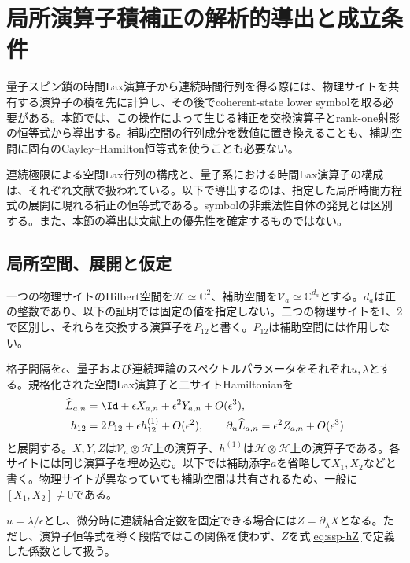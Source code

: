\section{局所演算子積補正の解析的導出と成立条件}
\label{sec:shared-site-analytic-proof}

量子スピン鎖の時間Lax演算子から連続時間行列を得る際には、物理サイトを共有する演算子の積を先に計算し、その後でcoherent-state lower symbolを取る必要がある。本節では、この操作によって生じる補正を交換演算子とrank-one射影の恒等式から導出する。補助空間の行列成分を数値に置き換えることも、補助空間に固有のCayley--Hamilton恒等式を使うことも必要ない。

連続極限による空間Lax行列の構成と、量子系における時間Lax演算子の構成は、それぞれ文献\cite{ADS2010,DoikouFindlay2017}で扱われている。以下で導出するのは、指定した局所時間方程式の展開に現れる補正の恒等式である。symbolの非乗法性自体の発見とは区別する。また、本節の導出は文献上の優先性を確定するものではない。

\subsection{局所空間、展開と仮定}

一つの物理サイトのHilbert空間を$\mathcal H\simeq\mathbb C^2$、補助空間を$\mathcal V_a\simeq\mathbb C^{d_a}$とする。$d_a$は正の整数であり、以下の証明では固定の値を指定しない。二つの物理サイトを1、2で区別し、それらを交換する演算子を$P_{12}$と書く。$P_{12}$は補助空間には作用しない。

格子間隔を$\epsilon$、量子および連続理論のスペクトルパラメータをそれぞれ$u,\lambda$とする。規格化された空間Lax演算子と二サイトHamiltonianを
\begin{align}
\widehat L_{a,n}&=\Id+\epsilon X_{a,n}+\epsilon^2Y_{a,n}+O(\epsilon^3),\label{eq:ssp-L}\\
h_{12}&=2P_{12}+\epsilon h^{(1)}_{12}+O(\epsilon^2),\qquad
\partial_u\widehat L_{a,n}=\epsilon^2Z_{a,n}+O(\epsilon^3)\label{eq:ssp-hZ}
\end{align}
と展開する。$X,Y,Z$は$\mathcal V_a\otimes\mathcal H$上の演算子、$h^{(1)}$は$\mathcal H\otimes\mathcal H$上の演算子である。各サイトには同じ演算子を埋め込む。以下では補助添字$a$を省略して$X_1,X_2$などと書く。物理サイトが異なっていても補助空間は共有されるため、一般に$[X_1,X_2]\ne0$である。

$u=\lambda/\epsilon$とし、微分時に連続結合定数を固定できる場合には$Z=\partial_\lambda X$となる。ただし、演算子恒等式を導く段階ではこの関係を使わず、$Z$を式\eqref{eq:ssp-hZ}で定義した係数として扱う。

